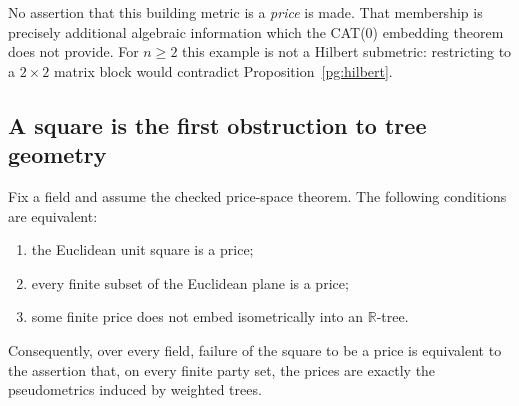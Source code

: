 No assertion that this building metric is a \emph{price} is made. That
membership is precisely additional algebraic information which the CAT(0)
embedding theorem does not provide. For $n\geq2$ this example is not a
Hilbert submetric: restricting to a $2\times2$ matrix block would contradict
Proposition~\ref{pg:hilbert}.

\subsection{A square is the first obstruction to tree geometry}

\begin{theorem}
\label{pg:square-gate}
Fix a field and assume the checked price-space theorem. The following
conditions are equivalent:
\begin{enumerate}
\item the Euclidean unit square is a price;
\item every finite subset of the Euclidean plane is a price;
\item some finite price does not embed isometrically into an $\mathbb R$-tree.
\end{enumerate}
Consequently, over every field, failure of the square to be a price is
equivalent to the assertion that, on every finite party set, the prices
are exactly the pseudometrics induced by weighted trees.
\end{theorem}
